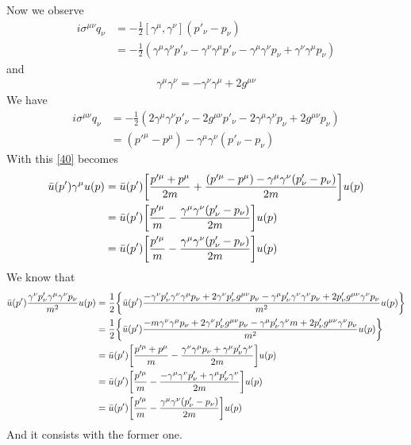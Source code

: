 \documentclass{article}
\begin{document}
Now we observe
\begin{align*}
  i\sigma^{\mu\nu}q_{\nu}&=-\frac{1}{2}[\gamma^{\mu},\gamma^{\nu}](p'_{\nu}-p_{\nu})\\
  &=-\frac{1}{2}(\gamma^{\mu}\gamma^{\nu}p'_{\nu}-\gamma^{\nu}\gamma^{\mu}p'_{\nu}-\gamma^{\mu}\gamma^{\nu}p_{\nu}+\gamma^{\nu}\gamma^{\mu}p_{\nu})
\end{align*}
and
\begin{align*}
  \gamma^{\mu}\gamma^{\nu}=-\gamma^{\nu}\gamma^{\mu}+2g^{\mu\nu}
\end{align*}
We have
\begin{align*}
  i\sigma^{\mu\nu}q_{\nu}&=-\frac{1}{2}(2\gamma^{\mu}\gamma^{\nu}p'_{\nu}-2g^{\mu\nu}p'_{\nu}-2\gamma^{\mu}\gamma^{\nu}p_{\nu}+2g^{\mu\nu}p_{\nu})\\&=(p'^{\mu}-p^{\mu})-\gamma^{\mu}\gamma^{\nu}(p'_{\nu}-p_{\nu})
\end{align*}
With this \eqref{40} becomes
\begin{align*}
  \bar{u}(p')\gamma^{\mu}u(p)&=\bar{u}(p')\bqty{\frac{p'^{\mu}+p^{\mu}}{2m}+\frac{(p'^{\mu}-p^{\mu})-\gamma^{\mu}\gamma^{\nu}(p'_{\nu}-p_{\nu})}{2m}}u(p)\\
  &=\bar{u}(p')\bqty{\frac{p'^{\mu}}{m}-\frac{\gamma^{\mu}\gamma^{\nu}(p'_{\nu}-p_{\nu})}{2m}}u(p)\\
  &=\bar{u}(p')\bqty{\frac{p'^{\mu}}{m}-\frac{\gamma^{\mu}\gamma^{\nu}(p'_{\nu}-p_{\nu})}{2m}}u(p)
\end{align*}
We know that
\begin{align*}
  \bar{u}(p')\frac{\gamma^{\nu}p'_{\nu}\gamma^{\mu}\gamma^{\nu}p_{\nu}}{m^2}u(p)&=\frac{1}{2}\Bqty{\bar{u}(p')\frac{-\gamma^{\nu}p'_{\nu}\gamma^{\nu}\gamma^{\mu}p_{\nu}+2\gamma^{\nu}p'_{\nu}g^{\mu\nu}p_{\nu}-\gamma^{\mu}p'_{\nu}\gamma^{\nu}\gamma^{\nu}p_{\nu}+2p'_{\nu}g^{\mu\nu}\gamma^{\nu}p_{\nu}}{m^2}u(p)}\\
  &=\frac{1}{2}\Bqty{\bar{u}(p')\frac{-m\gamma^{\nu}\gamma^{\mu}p_{\nu}+2\gamma^{\nu}p'_{\nu}g^{\mu\nu}p_{\nu}-\gamma^{\mu}p'_{\nu}\gamma^{\nu}m+2p'_{\nu}g^{\mu\nu}\gamma^{\nu}p_{\nu}}{m^2}u(p)}\\
  &=\bar{u}(p')\bqty{\frac{p'^{\mu}+p^{\mu}}{m}-\frac{\gamma^{\nu}\gamma^{\mu}p_{\nu}+\gamma^{\mu}p'_{\nu}\gamma^{\nu}}{2m}}u(p)\\
  &=\bar{u}(p')\bqty{\frac{p'^{\mu}}{m}-\frac{-\gamma^{\mu}\gamma^{\nu}p'_{\nu}+\gamma^{\mu}p'_{\nu}\gamma^{\nu}}{2m}}u(p)\\
  &=\bar{u}(p')\bqty{\frac{p'^{\mu}}{m}-\frac{\gamma^{\mu}\gamma^{\nu}(p'_{\nu}-p_{\nu})}{2m}}u(p)
\end{align*}
And it consists with the former one.
\end{document}
